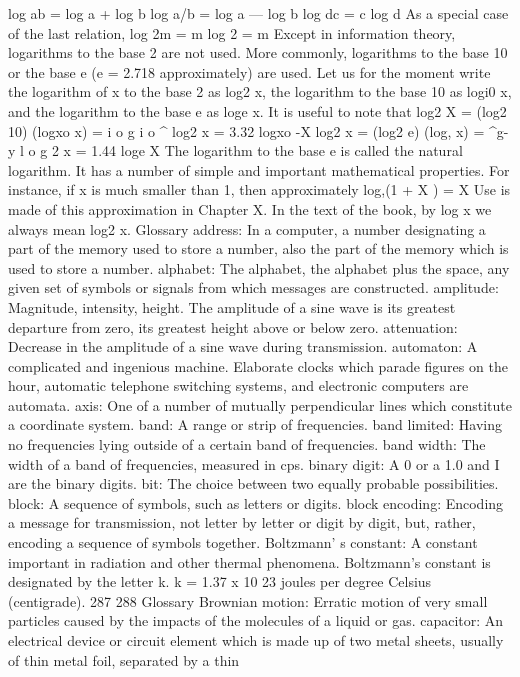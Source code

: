 {{{{{{{{{{{{{{{log ab = log a + log b
log a/b = log a — log b
log dc = c log d
As a special case of the last relation,
log 2m = m log 2 = m
Except in information theory, logarithms to the base 2 are not
used. More commonly, logarithms to the base 10 or the base e
(e = 2.718 approximately) are used.
Let us for the moment write the logarithm of x to the base 2 as
log2 x, the logarithm to the base 10 as logi0 x, and the logarithm
to the base e as loge x. It is useful to note that
log2 X = (log2 10) (logxo x) =
i o g i o ^
log2 x = 3.32 logxo -X
log2 x = (log2 e) (log, x) = ^g-y
l o g 2 x = 1.44 loge X
The logarithm to the base e is called the natural logarithm. It
has a number of simple and important mathematical properties.
For instance, if x is much smaller than 1, then approximately
log,(1 + X ) = X
Use is made of this approximation in Chapter X.
In the text of the book, by log x we always mean log2 x.
Glossary
address: In a computer, a number designating a part of the memory used
to store a number, also the part of the memory which is used to
store a number.
alphabet: The alphabet, the alphabet plus the space, any given set of
symbols or signals from which messages are constructed.
amplitude: Magnitude, intensity, height. The amplitude of a sine wave is
its greatest departure from zero, its greatest height above or below
zero.
attenuation: Decrease in the amplitude of a sine wave during transmission.
automaton: A complicated and ingenious machine. Elaborate clocks
which parade figures on the hour, automatic telephone switching
systems, and electronic computers are automata.
axis: One of a number of mutually perpendicular lines which constitute
a coordinate system.
band: A range or strip of frequencies.
band limited: Having no frequencies lying outside of a certain band of
frequencies.
band width: The width of a band of frequencies, measured in cps.
binary digit: A 0 or a 1.0 and I are the binary digits.
bit: The choice between two equally probable possibilities.
block: A sequence of symbols, such as letters or digits.
block encoding: Encoding a message for transmission, not letter by letter
or digit by digit, but, rather, encoding a sequence of symbols
together.
Boltzmann’
s constant: A constant important in radiation and other
thermal phenomena. Boltzmann’s constant is designated by the
letter k. k = 1.37 x 10 23 joules per degree Celsius (centigrade).
287
288 Glossary
Brownian motion: Erratic motion of very small particles caused by the
impacts of the molecules of a liquid or gas.
capacitor: An electrical device or circuit element which is made up of
two metal sheets, usually of thin metal foil, separated by a thin
}}}}}}}}}}}}}}}
